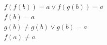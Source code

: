 \begin{align*}
%
& f(f(b)) = a \lor f(g(b)) = a
~\\~
& f(b) = a
~\\~
& g(b)  \neq  g(b) \lor g(b) = a
~\\~
& f(a)  \neq  a
%
\end{align*}
